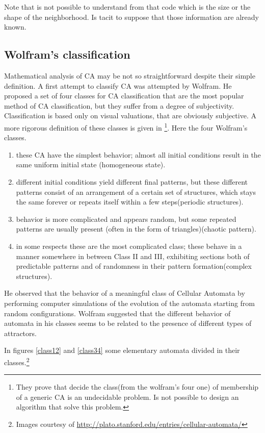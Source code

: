 Note that is not possible to understand from that code which is the size or the
shape of the neighborhood. Is tacit to suppose that those information are
already known.


\subsection{Wolfram's classification}
Mathematical analysis of CA may be not so straightforward despite their simple
definition. A first attempt to classify CA was attempted by
Wolfram\cite{wolfram2002}. He proposed a set of four classes for CA
classification that are the most popular method of CA classification, but they
suffer from a degree of subjectivity. Classification is based only on visual
valuations, that are obviously subjective. A more rigorous definition of these
classes is given in \footnote{They prove that decide the class(from the
wolfram's four one) of membership of a generic CA is an undecidable problem. Is
not possible to design an algorithm that solve this problem.}\cite{culik1998}.
Here the four Wolfram's classes.
\begin{enumerate}
  
  \item these CA have the simplest behavior; almost all initial conditions
  result in the same uniform initial state (homogeneous state).
  \item different initial conditions yield different final patterns, but
  these different patterns consist of an arrangement of a certain set of
  structures, which stays the same forever or repeats itself within a few
  steps(periodic structures).
  \item behavior is more complicated and appears random, but some repeated
  patterns are usually present (often in the form of triangles)(chaotic pattern).
  \item in some respects these are the most complicated class; these behave
  in a manner somewhere in between Class II and III, exhibiting sections
  both of predictable patterns and of randomness in their pattern
  formation(complex structures).
\end{enumerate}
He observed that the behavior of a meaningful class of Cellular Automata
by performing computer simulations of the evolution of the automata starting
from random configurations. Wolfram suggested that the different behavior of
automata in his classes seems to be related to the presence of different types
of attractors.

 
In figures \ref{class12} and \ref{class34} some elementary automata divided
in their classes.\footnote{Images courtesy of
\url{http://plato.stanford.edu/entries/cellular-automata/}}

